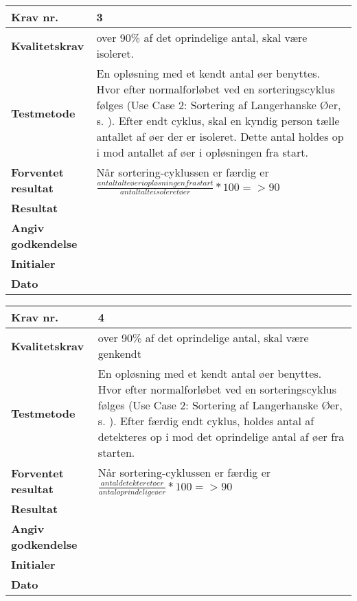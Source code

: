	\begin{center}
		\begin{longtable}{ | m{4cm}| m{8.5cm}|} 
			\hline
			\textbf{Krav nr.} & 3 \\ 
			\hline
			\textbf{Kvalitetskrav} & over 90\% af det oprindelige antal, skal være isoleret. \\
			\hline
			\textbf{Testmetode} &  En opløsning med et kendt antal øer benyttes. Hvor efter normalforløbet ved en sorteringscyklus følges (Use Case 2: Sortering af Langerhanske Øer, s. \pageref{uc:2}). Efter endt cyklus, skal en kyndig person tælle antallet af øer der er isoleret. Dette antal holdes op i mod antallet af øer i opløsningen fra start.  \\
			\hline
			\textbf{Forventet resultat}  & Når sortering-cyklussen er færdig er
 $\frac{antal talte øer i opløsningen fra start}{antal talte isoleret øer}*100= >90$
 \\
			\hline
			\textbf{Resultat}  &    \\
			\hline
			\textbf{Angiv godkendelse} &     \\
			\hline
			\textbf{Initialer} &     \\
			\hline
			\textbf{Dato} &    \\
			\hline
		\end{longtable}
	\end{center}		
			
	\begin{center}
		\begin{longtable}{ | m{4cm}| m{8.5cm}|} 
			\hline
			\textbf{Krav nr.} & 4 \\ 
			\hline
			\textbf{Kvalitetskrav} & over 90\% af det oprindelige antal, skal være genkendt \\
			\hline
			\textbf{Testmetode} &  En opløsning med et kendt antal øer benyttes. Hvor efter normalforløbet ved en sorteringscyklus følges (Use Case 2: Sortering af Langerhanske Øer, s. \pageref{uc:2}). Efter færdig endt cyklus, holdes antal af detekteres op i mod det oprindelige antal af øer fra starten.  \\
			\hline
			\textbf{Forventet resultat}  & Når sortering-cyklussen er færdig er
 $\frac{antal detekteret øer}{antal oprindelige øer} * 100 = >90$ \\
			\hline
			\textbf{Resultat}  &    \\
			\hline
			\textbf{Angiv godkendelse} &     \\
			\hline
			\textbf{Initialer} &     \\
			\hline
			\textbf{Dato} &    \\
			\hline
		\end{longtable}
	\end{center}				
			
